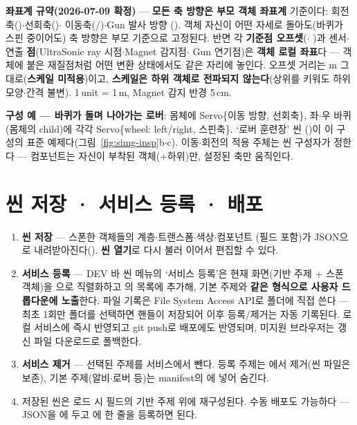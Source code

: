 \noindent\textbf{좌표계 규약(2026-07-09 확정)} --- \textbf{모든 축 방향은 부모 객체
좌표계} 기준이다: 회전축()$\cdot$선회축()$\cdot$
이동축(/)$\cdot$Gun 발사 방향
(). 객체 자신이 어떤 자세로 돌아도(바퀴가 스핀 중이어도) 축
방향은 부모 기준으로 고정된다. 반면 각 \textbf{기준점 오프셋}($\cdot$
)과 센서$\cdot$연출 \textbf{점}(UltraSonic ray 시점$\cdot$Magnet 감지점$\cdot$
Gun 연기점)은 \textbf{객체 로컬 좌표}다 --- 객체에 붙은 재질점처럼 어떤 변환 상태에서도
같은 자리에 놓인다. 오프셋 거리는 m 그대로(\textbf{스케일 미적용})이고, \textbf{스케일은
하위 객체로 전파되지 않는다}(상위를 키워도 하위 모양$\cdot$간격 불변). 1\,unit = 1\,m,
Magnet 감지 반경 5\,cm.

\smallskip
\noindent\textbf{구성 예 --- 바퀴가 돌며 나아가는 로버}: 몸체에 Servo\{이동 방향, 선회축\},
좌$\cdot$우 바퀴(몸체의 child)에 각각 Servo\{wheel: left/right, 스핀축\}. `로버 훈련장' 씬
()이 이 구성의 표준 예제다(그림~\ref{fig:simg-insp}b$\cdot$c).
이동$\cdot$회전의 적용 주체는 씬 구성자가 정한다 --- 컴포넌트는 자신이 부착된 객체(+하위)만,
설정된 축만 움직인다.

\section{씬 저장 · 서비스 등록 · 배포}
\label{sec:simg-deploy}
\begin{enumerate}
  \item \textbf{씬 저장} --- 스폰한 객체들의 계층$\cdot$트랜스폼$\cdot$색상$\cdot$컴포넌트
  (필드 포함)가 JSON으로 내려받아진다(). \textbf{씬 열기}로 다시
  불러 이어서 편집할 수 있다.
  \item \textbf{서비스 등록} --- DEV 바 씬 메뉴의 `서비스 등록'은 현재 화면(기반 주제 +
  스폰 객체)을 으로 직렬화하고 의
   목록에 추가해, 기본 주제와 \textbf{같은 형식으로 사용자 드롭다운에 노출}한다.
  파일 기록은 File System Access API로  폴더에 직접 쓴다 --- 최초 1회만
  폴더를 선택하면 핸들이 저장되어 이후 등록/제거는 자동 기록된다. 로컬 서비스에 즉시
  반영되고 git push로 배포에도 반영되며, 미지원 브라우저는 갱신 파일 다운로드로 폴백한다.
  \item \textbf{서비스 제거} --- 선택된 주제를 서비스에서 뺀다. 등록 주제는 
  에서 제거(씬 파일은 보존), 기본 주제(알비$\cdot$로버 등)는 manifest의 에
  넣어 숨긴다.
  \item 저장된 씬은 로드 시  필드의 기반 주제 위에 재구성된다. 수동 배포도
  가능하다 --- JSON을 에 두고 에
   한 줄을 등록하면 된다.
\end{enumerate}

